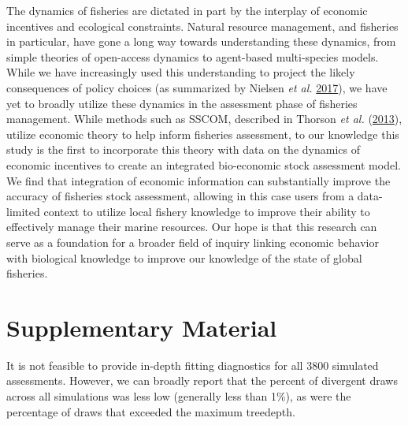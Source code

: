 \documentclass[twoside,12pt,final]{ucthesis-CA2012}
\begin{document}
\begin{ucmainmatter}
The dynamics of fisheries are dictated in part by the interplay of
economic incentives and ecological constraints. Natural resource
management, and fisheries in particular, have gone a long way towards
understanding these dynamics, from simple theories of open-access
dynamics to agent-based multi-species models. While we have increasingly
used this understanding to project the likely consequences of policy
choices (as summarized by Nielsen \emph{et al.}
\protect\hyperlink{ref-Nielsen2017}{2017}), we have yet to broadly
utilize these dynamics in the assessment phase of fisheries management.
While methods such as SSCOM, described in Thorson \emph{et al.}
(\protect\hyperlink{ref-Thorson2013a}{2013}), utilize economic theory to
help inform fisheries assessment, to our knowledge this study is the
first to incorporate this theory with data on the dynamics of economic
incentives to create an integrated bio-economic stock assessment model.
We find that integration of economic information can substantially
improve the accuracy of fisheries stock assessment, allowing in this
case users from a data-limited context to utilize local fishery
knowledge to improve their ability to effectively manage their marine
resources. Our hope is that this research can serve as a foundation for
a broader field of inquiry linking economic behavior with biological
knowledge to improve our knowledge of the state of global fisheries.

\section{Supplementary Material}\label{supplementary-material}

It is not feasible to provide in-depth fitting diagnostics for all 3800
simulated assessments. However, we can broadly report that the percent
of divergent draws across all simulations was less low (generally less
than 1\%), as were the percentage of draws that exceeded the maximum
treedepth.


\end{ucmainmatter}
\end{document}
